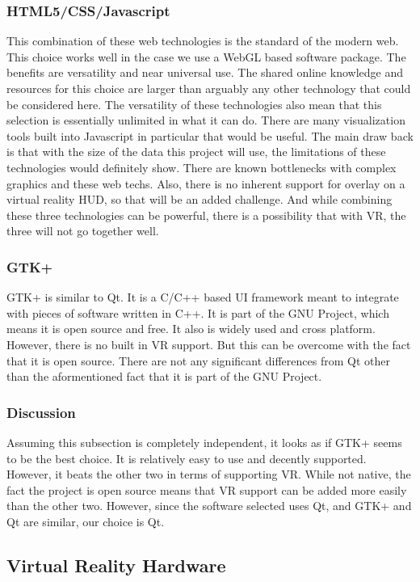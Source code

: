 \subsubsection{HTML5/CSS/Javascript}
This combination of these web technologies is the standard of the modern web. This choice works well
in the case we use a WebGL based software package. The benefits are versatility and near universal use.
The shared online knowledge and resources for this choice are larger than arguably any other technology
that could be considered here. The versatility of these technologies also mean that this selection 
is essentially unlimited in what it can do. There are many visualization tools built into Javascript
in particular that would be useful. The main draw back is that with the size of the data this project
will use, the limitations of these technologies would definitely show. There are known bottlenecks with
complex graphics and these web techs. Also, there is no inherent support for overlay on a virtual
reality HUD, so that will be an added challenge. And while combining these three technologies can
be powerful, there is a possibility that with VR, the three will not go together well.


\subsubsection{GTK+}
GTK+ is similar to Qt. It is a C/C++ based UI framework meant to integrate with pieces of software
written in C++. It is part of the GNU Project, which means it is open source and free. It also is
widely used and cross platform. However, there is no built in VR support. But this can be overcome
with the fact that it is open source. There are not any significant differences from Qt other than the
aformentioned fact that it is part of the GNU Project.

\subsubsection{Discussion}
Assuming this subsection is completely independent, it looks as if GTK+ seems to be the best choice.
It is relatively easy to use and decently supported. However, it beats the other two in terms of
supporting VR. While not native, the fact the project is open source means that VR support can
be added more easily than the other two. However, since the software selected uses Qt, and GTK+
and Qt are similar, our choice is Qt.

\subsection{Virtual Reality Hardware}

